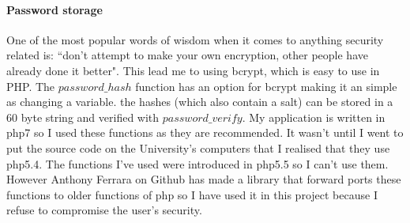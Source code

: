 \documentclass[12pt,a4paper]{report}
\begin{document}
	\paragraph{Password storage}
	One of the most popular words of wisdom when it comes to anything security related is: ``don't attempt to make your own encryption, other people have already done it better". This lead me to using bcrypt, which is easy to use in PHP. The $password\_hash$ function has an option for bcrypt making it an simple as changing a variable. the hashes (which also contain a salt) can be stored in a 60 byte string and verified with $password\_verify$. My application is written in php7 so I used these functions as they are recommended. It wasn't until I went to put the source code on the University's computers that I realised that they use php5.4. The functions I've used were introduced in php5.5 so I can't use them. However Anthony Ferrara on Github has made a library that forward ports these functions to older functions of php so I have used it in this project because I refuse to compromise the user's security.
\end{document}
